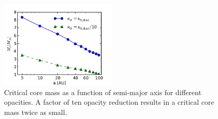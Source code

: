 \documentclass[apj]{emulateapj}
\begin{document}
%
% 
% 
%



\begin{figure}[h]
\centering
\includegraphics[width=0.5\textwidth]{../../figs/ModelAtmospheres/RadSelfGravPoly/PaperFigs/Mcrit_vs_a_3Myrs_opacity.pdf}
\caption{Critical core mass as a function of semi-major axis for different opacities. A factor of ten opacity reduction results in a critical core mass twice as small.}
\label{fig:Mcritopacity}
\end{figure}

%
\end{document}
